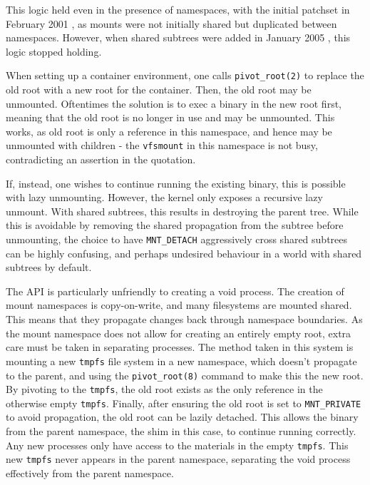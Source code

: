 \documentclass[12pt,a4paper,twoside]{report}
\begin{document}
This logic held even in the presence of namespaces, with the initial patchset in February 2001 \citep{viro_patch_2001}, as mounts were not initially shared but duplicated between namespaces. However, when shared subtrees were added in January 2005 \citep{viro_rfc_2005}, this logic stopped holding.

When setting up a container environment, one calls \texttt{pivot\_root(2)} to replace the old root with a new root for the container. Then, the old root may be unmounted. Oftentimes the solution is to exec a binary in the new root first, meaning that the old root is no longer in use and may be unmounted. This works, as old root is only a reference in this namespace, and hence may be unmounted with children - the \texttt{vfsmount} in this namespace is not busy, contradicting an assertion in the quotation.

If, instead, one wishes to continue running the existing binary, this is possible with lazy unmounting. However, the kernel only exposes a recursive lazy unmount. With shared subtrees, this results in destroying the parent tree. While this is avoidable by removing the shared propagation from the subtree before unmounting, the choice to have \texttt{MNT\_DETACH} aggressively cross shared subtrees can be highly confusing, and perhaps undesired behaviour in a world with shared subtrees by default.

The API is particularly unfriendly to creating a void process. The creation of mount namespaces is copy-on-write, and many filesystems are mounted shared. This means that they propagate changes back through namespace boundaries. As the mount namespace does not allow for creating an entirely empty root, extra care must be taken in separating processes. The method taken in this system is mounting a new \texttt{tmpfs} file system in a new namespace, which doesn't propagate to the parent, and using the \texttt{pivot\_root(8)} command to make this the new root. By pivoting to the \texttt{tmpfs}, the old root exists as the only reference in the otherwise empty \texttt{tmpfs}. Finally, after ensuring the old root is set to \texttt{MNT\_PRIVATE} to avoid propagation, the old root can be lazily detached. This allows the binary from the parent namespace, the shim in this case, to continue running correctly. Any new processes only have access to the materials in the empty \texttt{tmpfs}. This new \texttt{tmpfs} never appears in the parent namespace, separating the void process effectively from the parent namespace.

\end{document}
